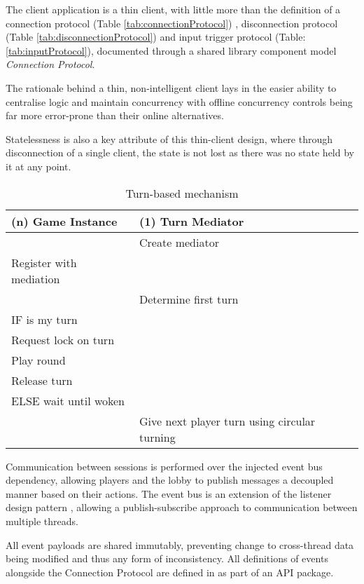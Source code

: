 The client application is a thin client, with little more than the definition of a connection protocol (Table \ref{tab:connectionProtocol}) , disconnection protocol (Table \ref{tab:disconnectionProtocol}) and input trigger protocol (Table: \ref{tab:inputProtocol}), documented through a shared library component model \textit{Connection Protocol}.

The rationale behind a thin, non-intelligent client lays in the easier ability to centralise logic and maintain concurrency with offline concurrency controls being far more error-prone than their online alternatives.

Statelessness is also a key attribute of this thin-client design, where through disconnection of a single client, the state is not lost as there was no state held by it at any point.

\begin{table}[H]
	\centering
	\begin{tabular}{ | l | l | }
		\hline
		(n) Game Instance & (1) Turn Mediator \\
		\hline
		\hline
		 &  Create mediator \\
		\hline
		Register with mediation &  \\
		\hline
		& Determine first turn \\
		\hline 
		IF is my turn & \\
		\hline
		Request lock on turn & \\
		\hline
		Play round & \\
		\hline
		Release turn &  \\
		\hline
		ELSE wait until woken & \\ 
		\hline
		& Give next player turn using circular turning  \\
		\hline
	\end{tabular}
	\caption{Turn-based mechanism}
	\label{tab:turnBasedMechanism}
\end{table}

Communication between sessions is performed over the injected event bus dependency, allowing players and the lobby to publish messages a decoupled manner based on their actions. The event bus is an extension of the listener design pattern \parencite{gamma1994design}, allowing a publish-subscribe approach to communication between multiple threads. 

All event payloads are shared immutably, preventing change to cross-thread data being modified and thus any form of inconsistency. All definitions of events alongside the Connection Protocol are defined in as part of an API package.

